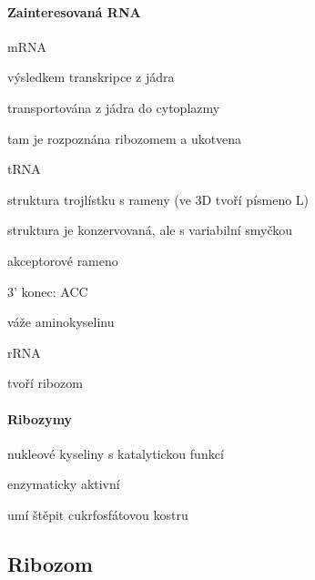 \documentclass[DIV=8]{scrreprt}
\begin{document}
\paragraph{Zainteresovaná RNA}
\begin{myItemize}[nosep]
    \item mRNA
\begin{myItemize}[nosep]
    \item výsledkem transkripce z jádra
    \item transportována z jádra do cytoplazmy
    \item tam je rozpoznána ribozomem a ukotvena
\end{myItemize}

    \item tRNA
\begin{myItemize}[nosep]
    \item struktura trojlístku s rameny (ve 3D tvoří písmeno L)
    \item struktura je konzervovaná, ale s variabilní smyčkou
    \item akceptorové rameno
\begin{myItemize}[nosep]
    \item 3' konec: ACC
    \item váže aminokyselinu
\end{myItemize}

\end{myItemize}

    \item rRNA
\begin{myItemize}[nosep]
    \item tvoří ribozom
\end{myItemize}

\end{myItemize}



\paragraph{Ribozymy}
\begin{myItemize}[nosep]
    \item nukleové kyseliny s katalytickou funkcí
    \item enzymaticky aktivní
    \item umí štěpit cukrfosfátovou kostru
\end{myItemize}



\subsection{Ribozom} \label{Ribozom}
\end{document}
